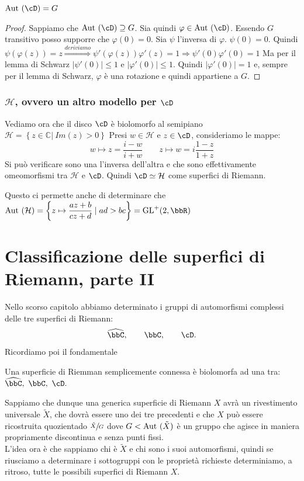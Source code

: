 \begin{proposizione}
$\Aut(\cD)=G$
\end{proposizione}
\begin{proof}
Sappiamo che $\Aut(\cD) \supseteq G$. Sia quindi $\varphi \in \Aut(\cD)$. Essendo $G$ transitivo posso supporre che $\varphi(0)=0$.
Sia $\psi$ l'inversa di $\varphi$. $\psi (0)=0$. Quindi
$\psi (\varphi (z))=z \stackrel{deriviamo}{\Longrightarrow} \psi ' (\varphi (z)) \varphi '(z) =1 \Rightarrow \psi'(0) \varphi'(0) =1$
Ma per il lemma di Schwarz $|\psi'(0)| \leq 1$ e $|\varphi'(0)| \leq 1$. Quindi $|\varphi'(0)|=1$ e, sempre per il lemma di Schwarz,
$\varphi$ è una rotazione e quindi appartiene a $G$.
\end{proof}

\subsection {$\mathcal{H}$, ovvero un altro modello per $\cD$}

Vediamo ora che il disco $\cD$ è biolomorfo al semipiano $\mathcal{H} = \left \{ z \in \mathbb{C} | \ Im (z)>0 \right \}$
Presi $w \in \mathcal{H}$ e $z \in \cD$, consideriamo le mappe:
$$w \mapsto z=\frac{i-w}{i+w} \qquad z \mapsto w= i\frac{1-z}{1+z}$$
Si può verificare sono una l'inversa dell'altra e che sono effettivamente omeomorfismi tra $\mathcal{H}$ e $\cD$.
Quindi $\cD \simeq \mathcal{H}$ come superfici di Riemann.

Questo ci permette anche di determinare che $\Aut( \mathcal{H}) = \left \{ z \mapsto \displaystyle{\frac{az+b}{cz+d}} \mid ad > bc \right \} = \GL^+ (2, \bbR)$


\chapter{Classificazione delle superfici di Riemann, parte II}

Nello scorso capitolo abbiamo determinato i gruppi di automorfismi complessi delle tre superfici di Riemann:
$$
\hat{\bbC},\qquad \bbC, \qquad \cD.
$$
Ricordiamo poi il fondamentale
\begin{teorema}[Riemann] Una superficie di Riemman semplicemente connessa è biolomorfa ad una tra:
$\hat{\bbC},\ \bbC, \ \cD. $
\end{teorema}
Sappiamo che dunque una generica superficie di Riemann $X$ avrà un rivestimento universale $\tilde{X}$, che dovrà essere uno dei tre precedenti e che $X$ può essere ricostruita quozientado $\sfrac{\tilde{X}}{G}$ dove $G<\text{Aut }(\tilde{X})$ è un gruppo che agisce in maniera propriamente discontinua e senza punti fissi.\\
L'idea ora è che sappiamo chi è $\tilde{X}$ e chi sono i suoi automorfismi, quindi se riusciamo a determinare i sottogruppi con le proprietà richieste determiniamo, a ritroso, tutte le possibili superfici di Riemann $X$.\\

